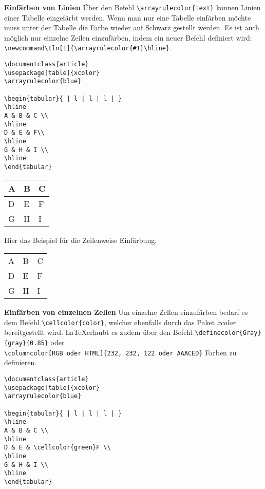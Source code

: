 \bigskip

\textbf{Einfärben von Linien}
Über den Befehl \verb|\arrayrulecolor{text}| können Linien einer Tabelle eingefärbt werden. Wenn man nur eine Tabelle einfärben möchte muss unter der Tabelle die Farbe wieder auf Schwarz gestellt werden. Es ist auch möglich nur einzelne Zeilen einzufärben, indem ein neuer Befehl definiert wird:\\ \verb|\newcommand\tln[1]{\arrayrulecolor{#1}\hline}|.

\begin{lstlisting}[style=LaTeX]
\documentclass{article}
\usepackage[table]{xcolor}
\arrayrulecolor{blue}

\begin{tabular}{ | l | l | l | }
\hline
A & B & C \\
\hline
D & E & F\\
\hline
G & H & I \\
\hline
\end{tabular}

\end{lstlisting}

	\begin{tabular}{ | l | l | l | }
		\hline
		A & B & C \\
		\hline
		D & E & F\\
		\hline
		G & H & I \\
		\hline
	\end{tabular}

Hier das Beispiel für die Zeilenweise Einfärbung.
\newcommand\tln[1]{\arrayrulecolor{#1}\hline}
\begin{tabular}{ | l | l | l | }
	\hline
	A & B & C \\ 
	\tln{red}
	D & E & F \\ 
	\hline
	G & H & I \\
	\hline
\end{tabular}

\bigskip

\textbf{Einfärben von einzelnen Zellen}
Um einzelne Zellen einzufärben bedarf es dem Befehl \verb|\cellcolor{color}|, welcher ebenfalls durch das Paket \emph{xcolor} bereitgestellt wird. \LaTeX erlaubt es zudem über den Befehl \verb|\definecolor{Gray}{gray}{0.85}| oder\\ \verb|\columncolor[RGB oder HTML]{232, 232, 122 oder AAACED}| Farben zu definieren. 

\begin{lstlisting}[style=LaTeX]
\documentclass{article}
\usepackage[table]{xcolor}
\arrayrulecolor{blue}

\begin{tabular}{ | l | l | l | }
\hline
A & B & C \\
\hline
D & E & \cellcolor{green}F \\
\hline
G & H & I \\
\hline
\end{tabular}

\end{lstlisting}


